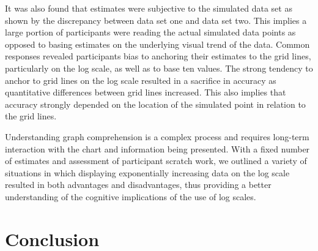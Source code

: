 \documentclass[print]{nuthesis}
\begin{document}
It was also found that estimates were subjective to the simulated data set as shown by the discrepancy between data set one and data set two.
This implies a large portion of participants were reading the actual simulated data points as opposed to basing estimates on the underlying visual trend of the data.
Common responses revealed participants bias to anchoring their estimates to the grid lines, particularly on the log scale, as well as to base ten values.
The strong tendency to anchor to grid lines on the log scale resulted in a sacrifice in accuracy as quantitative differences between grid lines increased.
This also implies that accuracy strongly depended on the location of the simulated point in relation to the grid lines.

Understanding graph comprehension is a complex process and requires long-term interaction with the chart and information being presented.
With a fixed number of estimates and assessment of participant scratch work, we outlined a variety of situations in which displaying exponentially increasing data on the log scale resulted in both advantages and disadvantages, thus providing a better understanding of the cognitive implications of the use of log scales.

\hypertarget{conclusion}{%
\chapter{Conclusion}\label{conclusion}}
\end{document}
